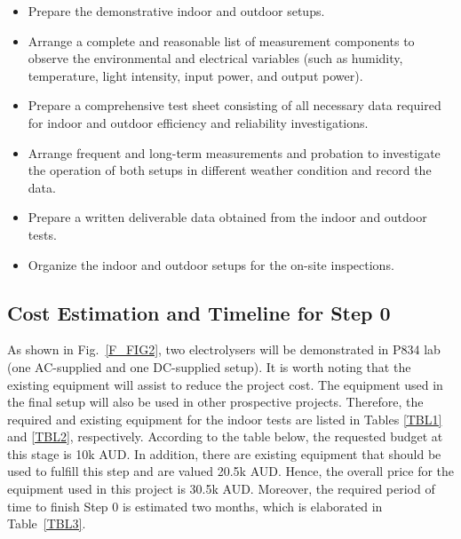 \documentclass[1pt]{extarticle}
\begin{document}
\begin{itemize}
\item Prepare the demonstrative indoor and outdoor setups.
\item Arrange a complete and reasonable list of measurement components to observe the environmental and electrical variables (such as humidity, temperature, light intensity, input power, and output power).
\item Prepare a comprehensive test sheet consisting of all necessary data required for indoor and outdoor efficiency and reliability investigations.
\item Arrange frequent and long-term measurements and probation to investigate the operation of both setups in different weather condition and record the data.
\item Prepare a written deliverable data obtained from the indoor and outdoor tests.
\item Organize the indoor and outdoor setups for the on-site inspections.
\end{itemize}

\subsection{Cost Estimation and Timeline for Step 0}
As shown in Fig.~\ref{F_FIG2}, two electrolysers will be demonstrated in P834 lab (one AC-supplied and one DC-supplied setup). It is worth noting that the existing equipment will assist to reduce the project cost. The equipment used in the final setup will also be used in other prospective projects. Therefore, the required and existing equipment for the indoor tests are listed in Tables \ref{TBL1} and \ref{TBL2}, respectively. According to the table below, the requested budget at this stage is 10k AUD. In addition, there are existing equipment that should be used to fulfill this step and are valued 20.5k AUD. Hence, the overall price for the equipment used in this project is 30.5k AUD. Moreover, the required period of time to finish Step 0 is estimated two months, which is elaborated in Table~\ref{TBL3}.
\end{document}
